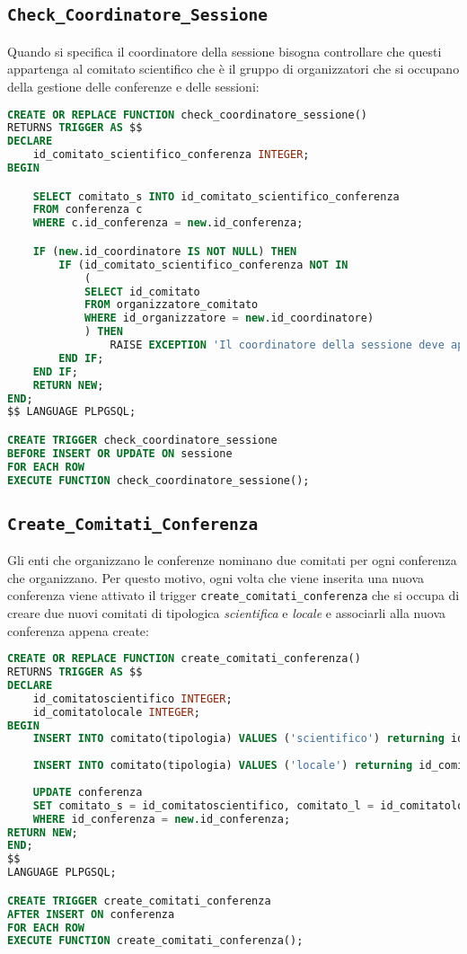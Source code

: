 \subsection{\texttt{Check\_Coordinatore\_Sessione}}
Quando si specifica il coordinatore della sessione bisogna controllare che questi appartenga al comitato scientifico che è il gruppo di organizzatori che si occupano della gestione delle conferenze e delle sessioni:
\begin{lstlisting}[caption={check\_coordinatore\_sessione}, language=sql, style=mystyle]
CREATE OR REPLACE FUNCTION check_coordinatore_sessione() 
RETURNS TRIGGER AS $$
DECLARE 
	id_comitato_scientifico_conferenza INTEGER;
BEGIN

	SELECT comitato_s INTO id_comitato_scientifico_conferenza
	FROM conferenza c
	WHERE c.id_conferenza = new.id_conferenza;

	IF (new.id_coordinatore IS NOT NULL) THEN
		IF (id_comitato_scientifico_conferenza NOT IN 
			(
			SELECT id_comitato 
			FROM organizzatore_comitato 
			WHERE id_organizzatore = new.id_coordinatore)
			) THEN
				RAISE EXCEPTION 'Il coordinatore della sessione deve appartenere al comitato scientifico della conferenza';
		END IF;
	END IF;
	RETURN NEW;
END;
$$ LANGUAGE PLPGSQL;

CREATE TRIGGER check_coordinatore_sessione
BEFORE INSERT OR UPDATE ON sessione
FOR EACH ROW
EXECUTE FUNCTION check_coordinatore_sessione();

\end{lstlisting}
\subsection{\texttt{Create\_Comitati\_Conferenza}}
Gli enti che organizzano le conferenze nominano due comitati per ogni conferenza che organizzano. Per questo motivo, ogni volta che viene inserita una nuova conferenza viene attivato il trigger \texttt{create\_comitati\_conferenza} che si occupa di creare due nuovi comitati di tipologica \textit{scientifica} e \textit{locale} e associarli alla nuova conferenza appena create:
\begin{lstlisting}[language=SQL, style=mystyle, caption={\texttt{create\_comitati\_conferenza}}]
CREATE OR REPLACE FUNCTION create_comitati_conferenza() 
RETURNS TRIGGER AS $$
DECLARE 
	id_comitatoscientifico INTEGER;
	id_comitatolocale INTEGER;
BEGIN
	INSERT INTO comitato(tipologia) VALUES ('scientifico') returning id_comitato INTO id_comitatoscientifico;
	
	INSERT INTO comitato(tipologia) VALUES ('locale') returning id_comitato INTO id_comitatolocale;
	
	UPDATE conferenza 
	SET comitato_s = id_comitatoscientifico, comitato_l = id_comitatolocale 
	WHERE id_conferenza = new.id_conferenza;
RETURN NEW;
END;
$$ 
LANGUAGE PLPGSQL;

CREATE TRIGGER create_comitati_conferenza
AFTER INSERT ON conferenza
FOR EACH ROW
EXECUTE FUNCTION create_comitati_conferenza();
\end{lstlisting}
